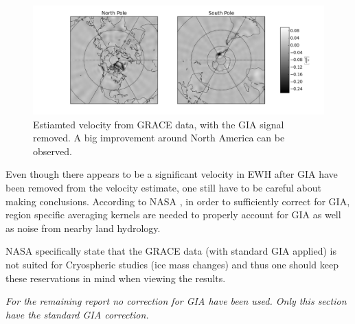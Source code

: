 \begin{figure}[H]
	\centering
	\includegraphics[width=\textwidth]{figures/gia-adjust-vel}
	\caption{Estiamted velocity from GRACE data, with the GIA signal removed. A big improvement around North America can be observed.}
	\label{fig:gia-adjust-vel}
\end{figure}

Even though there appears to be a significant velocity in EWH after GIA have been removed from the velocity estimate, one still have to be careful about making conclusions. According to NASA \cite{NASA-GIA-incomplete}, in order to sufficiently correct for GIA, region specific averaging kernels are needed to properly account for GIA as well as noise from nearby land hydrology.

NASA specifically state \cite{NASA-GIA-incomplete} that the GRACE data (with standard GIA applied) is not suited for Cryospheric studies (ice mass changes) and thus one should keep these reservations in mind when viewing the results.

\textit{For the remaining report no correction for GIA have been used. Only this section have the standard GIA correction.}
